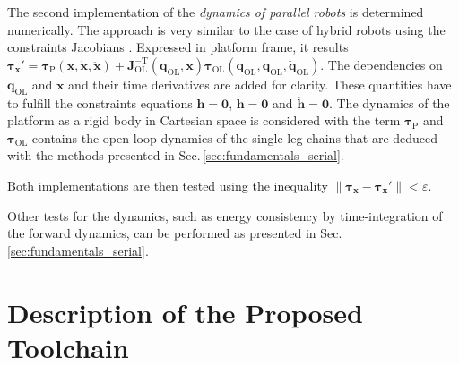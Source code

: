 \documentclass[runningheads]{llncs}
\newcommand{\transp}[0]{{\mathrm{T}}}
\begin{document}
\begin{property}\label{property:par_dyn}
The second implementation of the \emph{dynamics of parallel robots} \cite{DoThanhKotHeiOrt2009b} is determined numerically.
The approach is very similar to the case of hybrid robots using the constraints Jacobians \cite{SaminFis2003,Docquier2013}.
Expressed in platform frame, it results $\bm{\tau}_{\bm{x}}'{=}\bm{\tau}_{\mathrm{P}}(\bm{x},\dot{\bm{x}},\ddot{\bm{x}}){+}\bm{J}^{-\transp}_{\mathrm{OL}}(\bm{q}_{\mathrm{OL}},\bm{x}) \bm{\tau}_{\mathrm{OL}}(\bm{q}_{\mathrm{OL}},\dot{\bm{q}}_{\mathrm{OL}},\ddot{\bm{q}}_{\mathrm{OL}})$.
The dependencies on $\bm{q}_{\mathrm{OL}}$ and $\bm{x}$ and their time derivatives are added for clarity.
These quantities have to fulfill the constraints equations $\bm{h}{=}\bm{0}$, $\dot{\bm{h}}{=}\bm{0}$ and $\ddot{\bm{h}}{=}\bm{0}$.
The dynamics of the platform as a rigid body in Cartesian space is considered with the term $\bm{\tau}_{\mathrm{P}}$ and $\bm{\tau}_{\mathrm{OL}}$ contains the open-loop dynamics of the single leg chains that are deduced with the methods presented in Sec.\,\ref{sec:fundamentals_serial}. 
\end{property}

\begin{test}\label{test:par_dyn}
Both implementations are then tested using the inequality $\lVert\bm{\tau}_{\bm{x}}{-}\bm{\tau}_{\bm{x}}'\rVert {<} \varepsilon$.
\end{test}

Other tests for the dynamics, such as energy consistency by time-integration of the forward dynamics, can be performed as presented in Sec.\,\ref{sec:fundamentals_serial}.

\section{Description of the Proposed Toolchain}
\label{sec:toolchain}
\end{document}
